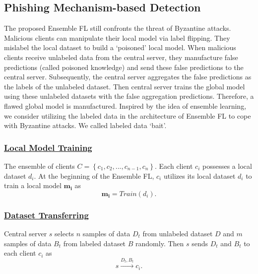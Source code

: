 \documentclass[journal]{IEEEtran}
\begin{document}
\subsection{Phishing Mechanism-based Detection}
The proposed Ensemble FL still confronts the threat of Byzantine attacks. Malicious clients can manipulate their local model via label flipping. They mislabel the local dataset to build a `poisoned' local model. When malicious clients receive unlabeled data from the central server, they manufacture false predictions (called poisoned knowledge) and send these false predictions to the central server. Subsequently, the central server aggregates the false predictions as the labels of the unlabeled dataset. Then central server trains the global model using these unlabeled datasets with the false aggregation predictions. Therefore, a flawed global model is manufactured. Inspired by the idea of ensemble learning, we consider utilizing the labeled data in the architecture of Ensemble FL to cope with Byzantine attacks. We called labeled data `bait'.
  \subsubsection{\ul{Local Model Training}} The ensemble of clients $C=\left \{ c_{1},c_{2},...,c_{n-1},c_{n} \right \}$. Each client $c_i$ possesses a local dataset $d_i$. At the beginning of the Ensemble FL, $c_{i}$ utilizes its local dataset $d_i$ to train a local model $\mathbf{m_i}$ as
  \begin{equation}
    \mathbf{m_i}=Train(d_i).
  \end{equation}
  \subsubsection{\ul{Dataset Transferring}} Central server $s$ selects $n$ samples of data $D_t$ from unlabeled dataset $D$ and $m$ samples of data $B_t$ from labeled dataset $B$ randomly. Then $s$ sends $D_t$ and $B_t$ to each client $c_i$ as
  \begin{equation}
    s \overset{{D_{t},B_{t}}}{\rightarrow} c_{i}.
  \end{equation}
\end{document}
